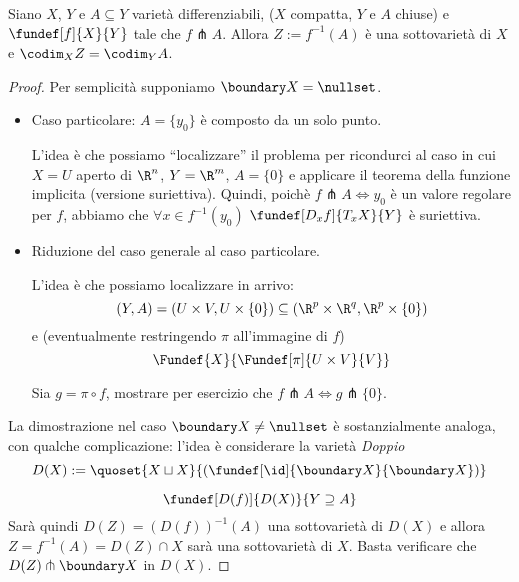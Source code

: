 

\begin{teo}
Siano $X$, $Y$ e $A\subseteq Y$ varietà differenziabili, ($X$ compatta, $Y$ e $A$ chiuse) e $\fundef[f]{X}{Y}$  tale che $f\pitchfork A$. Allora $Z := f^{-1}(A)$ è una sottovarietà di $X$ e $\codim_X{Z} = \codim_Y{A}$.
\end{teo}

\begin{proof}
Per semplicità supponiamo $\boundary X = \nullset$.\\
\begin{itemize}
\item Caso particolare: $A = \{ y_0 \}$ è composto da un solo punto.

L'idea è che possiamo ``localizzare'' il problema per ricondurci al caso in cui $X = U$ aperto di $\R^n$, $Y = \R^m$, $A = \{ 0 \}$ e applicare il teorema della funzione implicita (versione suriettiva). Quindi, poichè $f\pitchfork A \iff y_0$ è un valore regolare per $f$, abbiamo che $\forall x \in f^{-1}(y_0)$  $\fundef[D_xf]{T_xX}{Y}$ è suriettiva.
\item Riduzione del caso generale al caso particolare.

L'idea è che possiamo localizzare in arrivo: \[(Y,A) = (U \times V, U \times \{ 0 \}) \subseteq (\R^p \times \R^q, \R^p \times \{ 0 \})\]
e (eventualmente restringendo $\pi$ all'immagine di $f$)
\[ \Fundef{X}{\Fundef[\pi]{U \times V}{V}}\]
\begin{center}
  
\end{center}
Sia $g = \pi \circ f$, mostrare per esercizio che $f \pitchfork A \iff g \pitchfork \{ 0 \}$.
\end{itemize}

La dimostrazione nel caso $\boundary X \neq \nullset$ è sostanzialmente analoga, con qualche complicazione: l'idea è considerare la varietà \emph{Doppio}
\[D(X) := \quoset{X \sqcup X}{(\fundef[\id]{\boundary X}{\boundary X})}\]
\begin{center}
  
\end{center}
\[\fundef[D(f)]{D(X)}{Y \supseteq A}\]
Sarà quindi $D(Z) = (D(f))^{-1}(A)$ una sottovarietà di $D(X)$ e allora $Z = f^{-1}(A) = D(Z) \cap X$ sarà una sottovarietà di $X$. Basta verificare che $D(Z) \pitchfork \boundary X$ in $D(X)$.
\end{proof}

